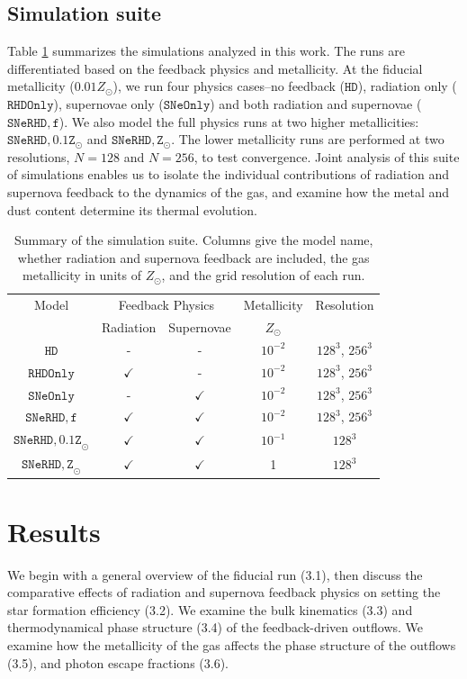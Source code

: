 \documentclass[twocolumn,linenumbers]{aastex631}
\begin{document}
\subsection{Simulation suite}
Table \ref{tab:tab1} summarizes the simulations analyzed in this work. The runs are differentiated based on the feedback physics and metallicity. At the fiducial metallicity ($0.01Z_\odot$), we run four physics cases--no feedback ($\mathtt{HD}$), radiation only ($\mathtt{RHDOnly}$), supernovae only ($\mathtt{SNeOnly}$) and both radiation and supernovae ($\mathtt{SNeRHD,f}$). We also model the full physics runs at two higher metallicities: $\mathtt{SNeRHD,0.1Z_\odot}$ and $\mathtt{SNeRHD,Z_\odot}$. The lower metallicity runs are performed at two resolutions, $N = 128$ and $N = 256$, to test convergence. 
Joint analysis of this suite of simulations enables us to isolate the individual contributions of radiation and supernova feedback to the dynamics of the gas, and examine how the metal and dust content determine its thermal evolution.\\

\begin{table}
    \centering
    \begin{tabular}{|c||c|c||c|c|}
    \hline
 Model& \multicolumn{2}{c|}{Feedback Physics}& Metallicity&Resolution\\
      &  Radiation &   Supernovae & $Z_\odot$& \\
     \hline 
     \hline
     $\mathtt{HD}$ &  -&   -&$10^{-2}$& $128^3$, $256^3$\\
     $\mathtt{RHDOnly}$ &  $\checkmark$&   -&$10^{-2}$& $128^3$, $256^3$\\
     $\mathtt{SNeOnly}$ &  -&   $\checkmark$&$10^{-2}$& $128^3$, $256^3$\\
     $\mathtt{SNeRHD,f}$&  $\checkmark$&   $\checkmark$&$10^{-2}$& $128^3$, $256^3$\\
 $\mathtt{SNeRHD,0.1Z}_\odot$& $\checkmark$& $\checkmark$&  $10^{-1}$&$128^3$\\
 $\mathtt{SNeRHD,Z}_\odot$& $\checkmark$& $\checkmark$& 1&$128^3$\\
 \hline
    \end{tabular}
    \caption{Summary of the simulation suite. Columns give the model name, whether radiation and supernova feedback are included, the gas metallicity in units of $Z_\odot$, and the grid resolution of each run.}
    \label{tab:tab1}
\end{table}

\section{Results}
We begin with a general overview of the fiducial run (3.1), then discuss the comparative effects of radiation and supernova feedback physics on setting the star formation efficiency (3.2). We examine the bulk kinematics (3.3) and thermodynamical phase structure (3.4) of the feedback-driven outflows. We examine how the metallicity of the gas affects the phase structure of the outflows (3.5), and photon escape fractions (3.6).
\end{document}
